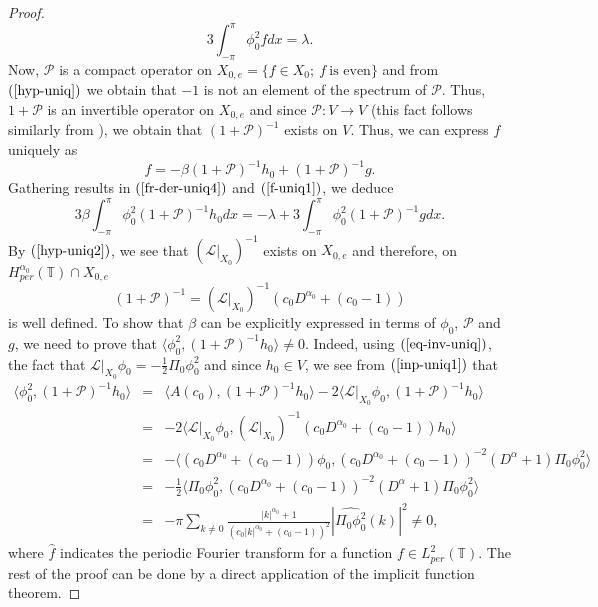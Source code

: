 \documentclass[12pt,reqno]{amsart}
\newcommand{\2}{L^2_{per}(0, T)}
\numberwithin{equation}{section}
\numberwithin{figure}{section}
\begin{document}
\begin{proof}
	\begin{equation}\label{fr-der-uniq4}
	3\int_{-\pi}^{\pi}\phi_0^2 fdx=\lambda.
	\end{equation}
	\indent Now, $\mathcal{P}$ is a compact operator on $X_{0,e}=\{f\in X_0;\  f\ \mbox{is even}\}$ and from $(\ref{hyp-uniq})$ we obtain that $-1$ is not an element of the spectrum of $\mathcal{P}$. Thus, $1+\mathcal{P}$ is an invertible operator on $X_{0,e}$ and since $\mathcal{P}: V\rightarrow V$ (this fact follows similarly from \cite[Lemma E.1]{FL}), we obtain that $(1+\mathcal{P})^{-1}$ exists on $V$. Thus, we can express $f$ uniquely as
	\begin{equation}\label{f-uniq1}
	f=-\beta(1+\mathcal{P})^{-1}h_0+(1+\mathcal{P})^{-1}g.
	\end{equation}
	Gathering results in $(\ref{fr-der-uniq4})$ and $(\ref{f-uniq1})$, we deduce
	\begin{equation}\label{inp-uniq1}
	 3\beta\int_{-\pi}^{\pi}\phi_0^2(1+\mathcal{P})^{-1}h_0dx=-\lambda+3\int_{-\pi}^{\pi}\phi_0^2(1+\mathcal{P})^{-1}gdx.
	\end{equation}
	\indent By $(\ref{hyp-uniq2})$, we see that $(\mathcal{L}|_{X_0})^{-1}$ exists on $X_{0,e}$ and therefore, on $H_{per}^{\alpha_0}(\mathbb{T})\cap X_{0,e}$
	\begin{equation}\label{eq-inv-uniq}
	(1+\mathcal{P})^{-1}=(\mathcal{L}|_{X_0})^{-1}(c_0D^{\alpha_0}+(c_0-1))
	\end{equation}
	is well defined. To show that $\beta$ can be explicitly expressed in terms of $\phi_0$, $\mathcal{P}$ and $g$, we need to prove that $\langle \phi_0^2,(1+\mathcal{P})^{-1}h_0\rangle\neq0$. Indeed, using $(\ref{eq-inv-uniq})$, the fact that $\mathcal{L}|_{X_0}\phi_0=-\frac{1}{2}\Pi_0\phi_0^2$ and since $h_0\in V$, we see from $(\ref{inp-uniq1})$ that
\begin{eqnarray*}
	\langle \phi_0^2, (1+\mathcal{P})^{-1}h_0\rangle  &=& \langle A(c_0), (1+\mathcal{P})^{-1}h_0 \rangle- 2 \langle \mathcal{L}|_{X_0}\phi_0, (1+\mathcal{P})^{-1}h_0 \rangle \\ &=& -2 \langle \mathcal{L}|_{X_0}\phi_0, (\mathcal{L}|_{X_0})^{-1}(c_0D^{\alpha_0}+(c_0-1))h_0 \rangle \\ &=& - \langle (c_0D^{\alpha_0}+(c_0-1))\phi_0,  (c_0D^{\alpha_0}+(c_0-1))^{-2}(D^{\alpha}+1)\Pi_0\phi_0^2 \rangle \\ &=& - \frac{1}{2} \langle \Pi_0 \phi_0^2, (c_0D^{\alpha_0}+(c_0-1))^{-2}(D^{\alpha}+1)\Pi_0\phi_0^2 \rangle \\ &=& - \pi \sum_{k \neq 0}\frac{|k|^{\alpha_0} +1}{ (c_0|k|^{\alpha_0}+(c_0-1))^2} | \widehat{\Pi_0 \phi_0^2}(k)|^2 \neq 0,
\end{eqnarray*}
where $\widehat{f}$ indicates the periodic Fourier transform for a function $f\in L_{per}^2(\mathbb{T})$. The rest of the proof can be done by a direct application of the implicit function theorem.
\end{proof}
\end{document}
